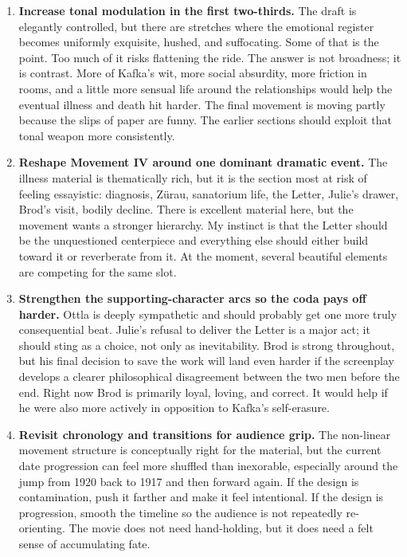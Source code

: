 \begin{enumerate}
\item \textbf{Increase tonal modulation in the first two-thirds.} The draft is elegantly controlled, but there are stretches where the emotional register becomes uniformly exquisite, hushed, and suffocating. Some of that is the point. Too much of it risks flattening the ride. The answer is not broadness; it is contrast. More of Kafka's wit, more social absurdity, more friction in rooms, and a little more sensual life around the relationships would help the eventual illness and death hit harder. The final movement is moving partly because the slips of paper are funny. The earlier sections should exploit that tonal weapon more consistently.

\item \textbf{Reshape Movement IV around one dominant dramatic event.} The illness material is thematically rich, but it is the section most at risk of feeling essayistic: diagnosis, Z\"urau, sanatorium life, the Letter, Julie's drawer, Brod's visit, bodily decline. There is excellent material here, but the movement wants a stronger hierarchy. My instinct is that the Letter should be the unquestioned centerpiece and everything else should either build toward it or reverberate from it. At the moment, several beautiful elements are competing for the same slot.

\item \textbf{Strengthen the supporting-character arcs so the coda pays off harder.} Ottla is deeply sympathetic and should probably get one more truly consequential beat. Julie's refusal to deliver the Letter is a major act; it should sting as a choice, not only as inevitability. Brod is strong throughout, but his final decision to save the work will land even harder if the screenplay develops a clearer philosophical disagreement between the two men before the end. Right now Brod is primarily loyal, loving, and correct. It would help if he were also more actively in opposition to Kafka's self-erasure.

\item \textbf{Revisit chronology and transitions for audience grip.} The non-linear movement structure is conceptually right for the material, but the current date progression can feel more shuffled than inexorable, especially around the jump from 1920 back to 1917 and then forward again. If the design is contamination, push it farther and make it feel intentional. If the design is progression, smooth the timeline so the audience is not repeatedly re-orienting. The movie does not need hand-holding, but it does need a felt sense of accumulating fate.
\end{enumerate}

